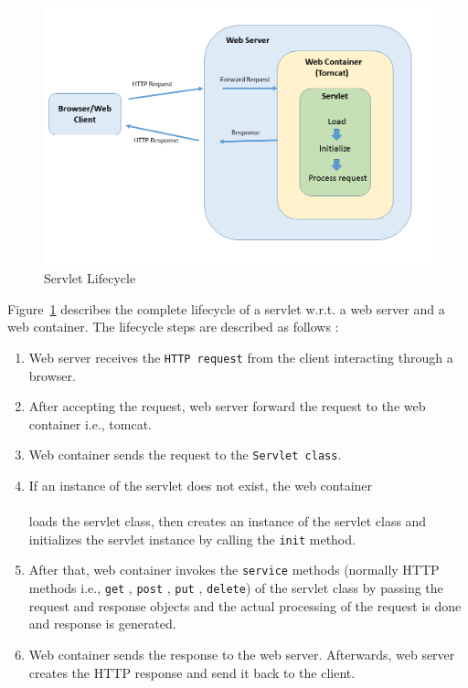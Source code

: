 \begin{figure}
	\includegraphics[width=1\textwidth]{figures/Server_Servlet}
	\caption{Servlet Lifecycle}
	\label{fig:Server_Servlet}
\end{figure}

Figure~\ref{fig:Server_Servlet} describes the complete lifecycle of a servlet w.r.t. a web server and a web container. The lifecycle steps are described as follows \cite{servlet}:
\begin{enumerate}
	\item {Web server receives the \texttt{HTTP request} from the client interacting through a browser.}
	\item {After accepting the request, web server forward the request to the web container i.e., tomcat.}
	\item {Web container sends the request to the \texttt{Servlet class}.}
	\item {If an instance of the servlet does not exist, the web container}\\\\
	loads the servlet class, then creates an instance of the servlet class and initializes the servlet instance by calling the \texttt{init} method.
	\item {After that, web container invokes the \texttt{service} methods (normally HTTP methods i.e., \texttt{get} , \texttt{post} , \texttt{put} , \texttt{delete}) of the servlet class by passing the request and response objects and the actual processing of the request is done and response is generated.}
	\item {Web container sends the response to the web server. Afterwards, web server creates the HTTP response and send it back to the client.}
\end{enumerate}

